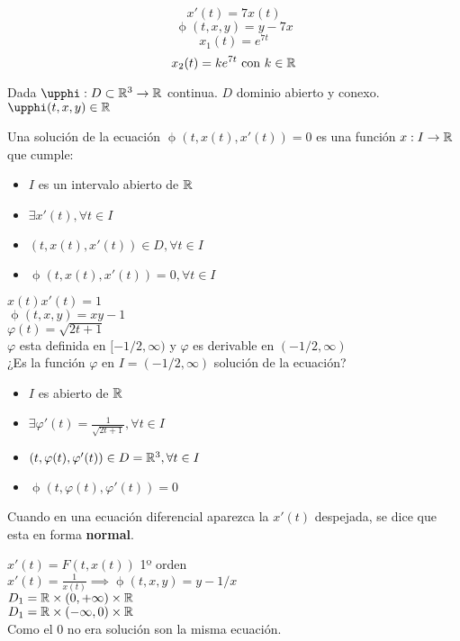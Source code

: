 \begin{ejemplo}

\[ x'(t) = 7x(t) \]
\[ \upphi(t,x,y) = y - 7x \]
\[ x_1(t) = e^{7t} \]
\[ x_2(t) = ke^{7t} \text{ con } k \in \mathbb{R} \] 


\end{ejemplo}

Dada $\upphi: D\subset\R^3\to\R$ continua.
$D$ dominio abierto y conexo.
$\upphi(t,x,y)\in\R$

\begin{ndef}

Una solución de la ecuación $\upphi(t, x(t), x'(t)) = 0$ es una función $x:I\to\mathbb{R}$ que cumple:
\begin{itemize}
\item $I$ es un intervalo abierto de $\mathbb{R}$
\item $\exists x'(t), \forall t \in I$
\item $(t, x(t), x'(t)) \in D, \forall t \in I$
\item $\upphi(t,x(t),x'(t)) = 0, \forall t \in I$
\end{itemize}

\end{ndef}


\begin{ejemplo}
$x(t)x'(t) = 1$\\
$ \upphi(t,x,y) = xy - 1$\\
$ \varphi(t) = \sqrt{2t+1}  $\\

$\varphi$ esta definida en $[-1/2, \infty)$ y $\varphi$ es derivable en $(-1/2, \infty)$\\
¿Es la función $\varphi$ en $I = (-1/2, \infty)$ solución de la ecuación?

\begin{itemize}
\item $I$ es abierto de $\mathbb{R}$
\item $\exists \varphi'(t) = \frac{1}{\sqrt{2t+1}}, \forall t \in I$
\item $(t, \varphi(t), \varphi'(t)) \in D = \mathbb{R}^3, \forall t \in I$
\item $\upphi(t, \varphi(t), \varphi'(t)) = 0$
\end{itemize}

Cuando en una ecuación diferencial aparezca la $x'(t)$ despejada, se dice que esta en forma \textbf{normal}. 

$x'(t) = F(t,x(t))$ 1º orden\\

$x'(t) = \frac{1}{x(t)} \implies \upphi(t,x,y) = y - 1/x$\\
$D_1 = \mathbb{R} \times (0,+\infty )\times \mathbb{R}$\\
$D_1 = \mathbb{R} \times (-\infty ,0)\times \mathbb{R}$\\
Como el 0 no era solución son la misma ecuación.


\end{ejemplo}

